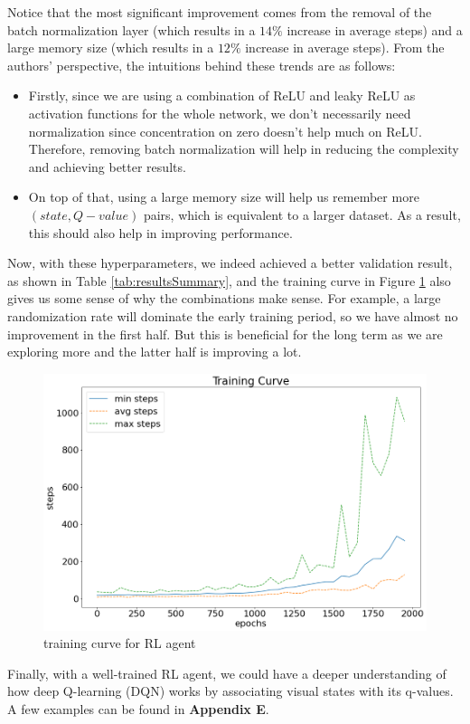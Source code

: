 \documentclass[letterpaper]{article} %
\begin{document}
\begin{itemize}
  Notice that the most significant improvement comes from the removal of the batch normalization layer (which results in a $14\%$ increase in average steps) and a large memory size (which results in a $12\%$ increase in average steps). From the authors' perspective, the intuitions behind these trends are as follows:
  \begin{itemize}
    \item 
    Firstly, since we are using a combination of ReLU and leaky ReLU as activation functions for the whole network, we don't necessarily need normalization since concentration on zero doesn't help much on ReLU. Therefore, removing batch normalization will help in reducing the complexity and achieving better results.
    \item 
    On top of that, using a large memory size will help us remember more $(state, Q-value)$ pairs, which is equivalent to a larger dataset. As a result, this should also help in improving performance.
  \end{itemize}
  Now, with these hyperparameters, we indeed achieved a better validation result, as shown in Table \ref{tab:resultsSummary}, and the training curve in Figure \ref{fig:tc} also gives us some sense of why the combinations make sense. For example, a large randomization rate will dominate the early training period, so we have almost no improvement in the first half. But this is beneficial for the long term as we are exploring more and the latter half is improving a lot.
 
  \begin{figure}[h!]
    \centering
    \includegraphics[width=0.9\linewidth]{figures/train_curve}
    \caption{training curve for RL agent}
    \label{fig:tc}
  \end{figure}

  Finally, with a well-trained RL agent, we could have a deeper understanding of how deep Q-learning (DQN) works by associating visual states with its q-values. A few examples can be found in \textbf{Appendix E}.
\end{itemize}
\end{document}
